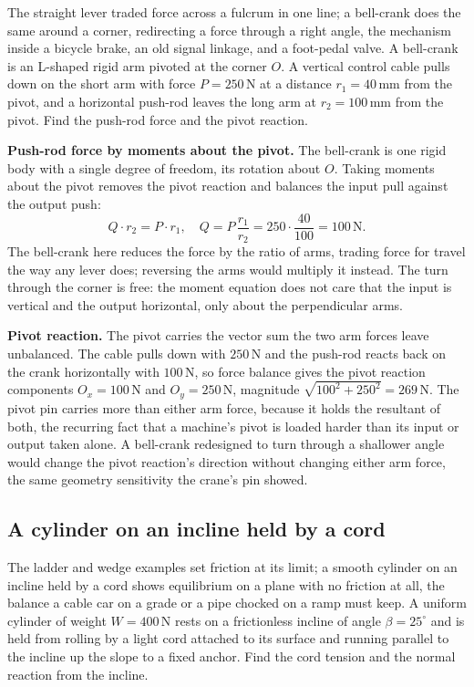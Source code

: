 The straight lever traded force across a fulcrum in one line; a bell-crank does
the same around a corner, redirecting a force through a right angle, the
mechanism inside a bicycle brake, an old signal linkage, and a foot-pedal
valve. A bell-crank is an L-shaped rigid arm pivoted at the corner $O$. A
vertical control cable pulls down on the short arm with force
$P = 250\,\text{N}$ at a distance $r_1 = 40\,\si{\milli\meter}$ from the pivot,
and a horizontal push-rod leaves the long arm at $r_2 = 100\,\si{\milli\meter}$
from the pivot. Find the push-rod force and the pivot reaction.

\textbf{Push-rod force by moments about the pivot.} The bell-crank is one rigid
body with a single degree of freedom, its rotation about $O$. Taking moments
about the pivot removes the pivot reaction and balances the input pull against
the output push:
\[
Q \cdot r_2 = P \cdot r_1, \quad
Q = P\,\frac{r_1}{r_2} = 250 \cdot \frac{40}{100} = 100\,\text{N}.
\]
The bell-crank here reduces the force by the ratio of arms, trading force for
travel the way any lever does; reversing the arms would multiply it instead. The
turn through the corner is free: the moment equation does not care that the
input is vertical and the output horizontal, only about the perpendicular arms.

\textbf{Pivot reaction.} The pivot carries the vector sum the two arm forces
leave unbalanced. The cable pulls down with $250\,\text{N}$ and the push-rod
reacts back on the crank horizontally with $100\,\text{N}$, so force balance
gives the pivot reaction components $O_x = 100\,\text{N}$ and
$O_y = 250\,\text{N}$, magnitude $\sqrt{100^2 + 250^2} = 269\,\text{N}$. The
pivot pin carries more than either arm force, because it holds the resultant of
both, the recurring fact that a machine's pivot is loaded harder than its input
or output taken alone. A bell-crank redesigned to turn through a shallower angle
would change the pivot reaction's direction without changing either arm force,
the same geometry sensitivity the crane's pin showed.

\subsection{A cylinder on an incline held by a cord}

The ladder and wedge examples set friction at its limit; a smooth cylinder on
an incline held by a cord shows equilibrium on a plane with no friction at all,
the balance a cable car on a grade or a pipe chocked on a ramp must keep. A
uniform cylinder of weight $W = 400\,\text{N}$ rests on a frictionless incline
of angle $\beta = 25^\circ$ and is held from rolling by a light cord attached to
its surface and running parallel to the incline up the slope to a fixed anchor.
Find the cord tension and the normal reaction from the incline.

